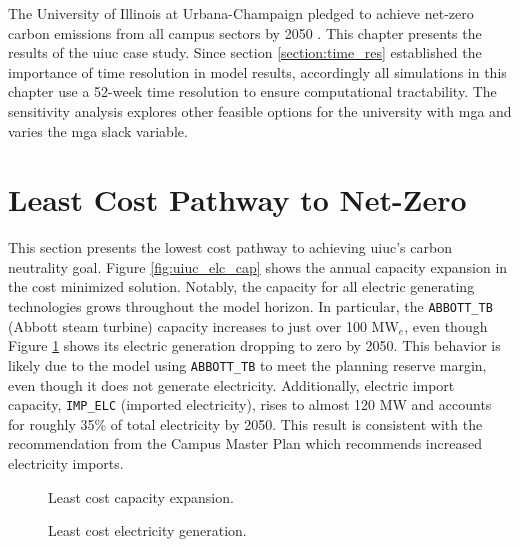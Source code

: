 The University of Illinois at Urbana-Champaign pledged to achieve net-zero carbon
emissions from all campus sectors by 2050
\cite{institute_for_sustainability_energy_and_environment_illinois_2015}. This
chapter presents the results of the \gls{uiuc} case study. Since section
\ref{section:time_res} established the importance of time resolution in model results,
accordingly all simulations in this chapter use a 52-week time resolution to ensure
computational tractability. The sensitivity analysis explores other feasible options
for the university with \gls{mga} and varies the \gls{mga} slack variable.

\section{Least Cost Pathway to Net-Zero}
This section presents the lowest cost pathway to achieving \gls{uiuc}'s carbon
neutrality goal.
Figure \ref{fig:uiuc_elc_cap} shows the annual capacity expansion in the cost
minimized solution. Notably, the capacity for all electric generating technologies
grows throughout the model horizon. In particular, the \texttt{ABBOTT\_TB}
(Abbott steam turbine) capacity
increases to just over 100 MW$_e$, even though Figure \ref{fig:uiuc_elc_gen}
shows its electric generation dropping to zero by 2050. This behavior is likely due to
the model using \texttt{ABBOTT\_TB} to meet the planning
reserve margin, even though it does not generate electricity. Additionally,
electric import capacity, \texttt{IMP\_ELC} (imported electricity), rises
to almost 120 MW and accounts for roughly 35\% of total electricity by 2050.
This result is consistent with the recommendation from the Campus Master Plan
\cite{affiliated_engineers_inc_utilities_2015} which recommends increased
electricity imports.

\begin{figure}[H]
  \begin{minipage}{0.48\textwidth}
    \captionsetup{type=figure}
    \centering
    \resizebox{\columnwidth}{!}{}
    \caption[]{Least cost capacity expansion.}
    \label{fig:uiuc_elc_cap}
  \end{minipage}
  \begin{minipage}{0.48\textwidth}
    \centering
    \resizebox{\columnwidth}{!}{}
    \caption[]{Least cost electricity generation.}
    \label{fig:uiuc_elc_gen}
  \end{minipage}
\end{figure}

